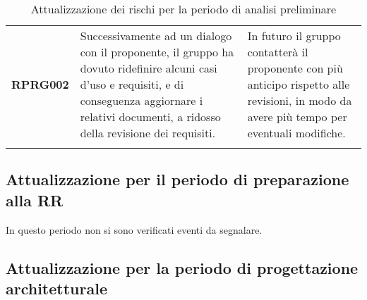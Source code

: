 \documentclass[../piano-di-progetto]{subfiles}
\begin{document}
\begin{longtable}[H]{|p{10em}|p{17em}|p{17em}|}
  \textbf{RPRG002}                                    & Successivamente ad un dialogo con il proponente, il gruppo ha dovuto ridefinire alcuni casi d'uso e requisiti, e di conseguenza aggiornare i relativi documenti, a ridosso della revisione dei requisiti.     & In futuro il gruppo contatterà il proponente con più anticipo rispetto alle revisioni, in modo da avere più tempo per eventuali modifiche.                                      \\
  \rowcolor{white}
  \caption{Attualizzazione dei rischi per la periodo di analisi preliminare}%
  \label{tab:attualizzazione_periodo_analisi_preliminare}
\end{longtable}


\subsection{Attualizzazione per il periodo di preparazione alla RR}%
\label{sub:attualizzazione_periodo_prep_RR}
In questo periodo non si sono verificati eventi da segnalare.

\subsection{Attualizzazione per la periodo di progettazione architetturale}%
\label{sub:attualizzazione_per_la_periodo_di_progettazione_architetturale}
\end{document}
